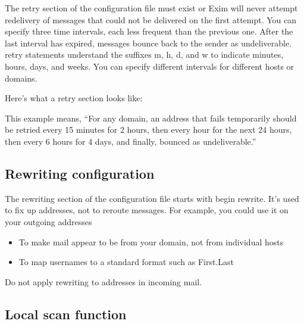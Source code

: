 \protect\hypertarget{part0026_split_052.htmlux5cux23_idIndexMarker2668}{}{}The
{retry} section of the configuration file must exist or Exim will never
attempt redelivery of messages that could not be delivered on the first
attempt. You can specify three time intervals, each less frequent than
the previous one. After the last interval has expired, messages bounce
back to the sender as undeliverable. {retry} statements understand the
suffixes {m}, {h}, {d}, and {w} to indicate minutes, hours, days, and
weeks. You can specify different intervals for different hosts or
domains.

Here's what a {retry} section looks like:


This example means, ``For any domain, an address that fails temporarily
should be retried every 15 minutes for 2 hours, then every hour for the
next 24 hours, then every 6 hours for 4 days, and finally, bounced as
undeliverable.''

\protect\hypertarget{part0026_split_053.html}{}{}

\hypertarget{part0026_split_053.htmlux5cux23_idContainer1247}{}
\hypertarget{part0026_split_053.htmlux5cux23calibre_pb_52}{%
\subsection[Rewriting
configuration]{\texorpdfstring{\protect\hypertarget{part0026_split_053.htmlux5cux23_idTextAnchor1159}{}{}Rewriting
configuration}{Rewriting configuration}}\label{part0026_split_053.htmlux5cux23calibre_pb_52}}

\protect\hypertarget{part0026_split_053.htmlux5cux23_idIndexMarker2669}{}{}The
rewriting section of the configuration file starts with {begin rewrite}.
It's used to fix up addresses, not to reroute messages. For example, you
could use it on your outgoing addresses

\begin{itemize}
\item
  To make mail appear to be from your domain, not from individual hosts
\item
  To map usernames to a standard format such as First.Last
\end{itemize}

Do not apply rewriting to addresses in incoming mail.

\protect\hypertarget{part0026_split_054.html}{}{}

\hypertarget{part0026_split_054.htmlux5cux23_idContainer1247}{}
\hypertarget{part0026_split_054.htmlux5cux23calibre_pb_53}{%
\subsection[Local scan
function]{\texorpdfstring{\protect\hypertarget{part0026_split_054.htmlux5cux23_idTextAnchor1160}{}{}Local
scan
function}{Local scan function}}\label{part0026_split_054.htmlux5cux23calibre_pb_53}}

